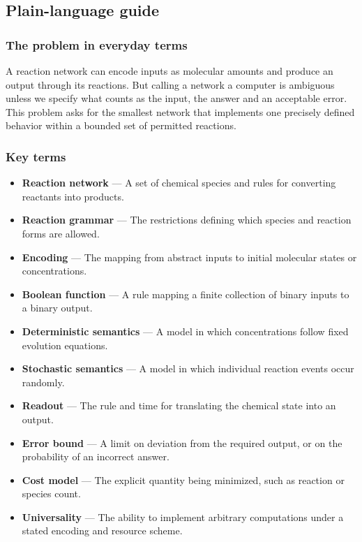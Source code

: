 \documentclass[
  11pt,
]{article}
\begin{document}
\subsection{Plain-language guide}

\subsubsection{The problem in everyday terms}

A reaction network can encode inputs as molecular amounts and produce an
output through its reactions. But calling a network a computer is
ambiguous unless we specify what counts as the input, the answer and an
acceptable error. This problem asks for the smallest network that
implements one precisely defined behavior within a bounded set of
permitted reactions.

\subsubsection{Key terms}

\begin{itemize}
\item
  \textbf{Reaction network} --- A set of chemical species and rules for
  converting reactants into products.
\item
  \textbf{Reaction grammar} --- The restrictions defining which species
  and reaction forms are allowed.
\item
  \textbf{Encoding} --- The mapping from abstract inputs to initial
  molecular states or concentrations.
\item
  \textbf{Boolean function} --- A rule mapping a finite collection of
  binary inputs to a binary output.
\item
  \textbf{Deterministic semantics} --- A model in which concentrations
  follow fixed evolution equations.
\item
  \textbf{Stochastic semantics} --- A model in which individual reaction
  events occur randomly.
\item
  \textbf{Readout} --- The rule and time for translating the chemical
  state into an output.
\item
  \textbf{Error bound} --- A limit on deviation from the required
  output, or on the probability of an incorrect answer.
\item
  \textbf{Cost model} --- The explicit quantity being minimized, such as
  reaction or species count.
\item
  \textbf{Universality} --- The ability to implement arbitrary
  computations under a stated encoding and resource scheme.
\end{itemize}
\end{document}
